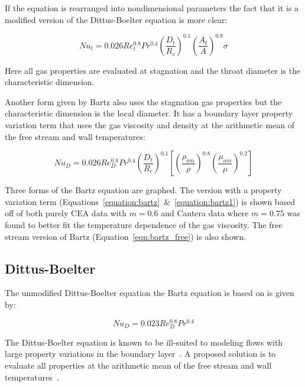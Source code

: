 \documentclass[11pt]{article}
\begin{document}
If the equation is rearranged into nondimensional parameters the fact that it is a modified version of the Dittus-Boelter equation is more clear:

\begin{equation}\label{equation:bartz1}
  Nu_{t} = 0.026 Re_{t}^{0.8} Pr^{0.4} \left( \frac{D_t}{R_c} \right)^{0.1} \left( \frac{A_t}{A} \right)^{0.9} \sigma
\end{equation}

Here all gas properties are evaluated at stagnation and the throat diameter is the characteristic dimension.

Another form given by Bartz also uses the stagnation gas properties but the characteristic dimension is the local diameter. It has a boundary layer property variation term that uses the gas viscosity and density at the arithmetic mean of the free stream and wall temperatures:

\begin{equation}\label{eqn:bartz_free}
  Nu_{D} = 0.026 Re_{D}^{0.8} Pr^{0.4} \left( \frac{D_t}{R_c} \right)^{0.1} \left[ \left( \frac{\rho_{am}}{\rho} \right)^{0.8} \left(\frac{\mu_{am}}{\mu} \right)^{0.2}\right]
\end{equation}

Three forms of the Bartz equation are graphed. The version with a property variation term (Equations~\ref{equation:bartz}~\&~\ref{equation:bartz1}) is shown based off of both purely CEA data with $m=0.6$ and Cantera data where $m=0.75$ was found to better fit the temperature dependence of the gas viscosity. The free stream version of Bartz (Equation~\ref{eqn:bartz_free}) is also shown.

\subsection{Dittus-Boelter}

The unmodified Dittus-Boelter equation the Bartz equation is based on is given by:

\begin{equation}
  Nu_{D} = 0.023 Re_{D}^{0.8} Pr^{0.4}
\end{equation}

The Dittus-Boelter equation is known to be ill-suited to modeling flows with large property variations in the boundary layer~\cite{bergman_fundamentals_2017}. A proposed solution is to evaluate all properties at the arithmetic mean of the free stream and wall temperatures~\cite{bartz_turbulent_1965, grisson_liquid_1991}.
\end{document}
